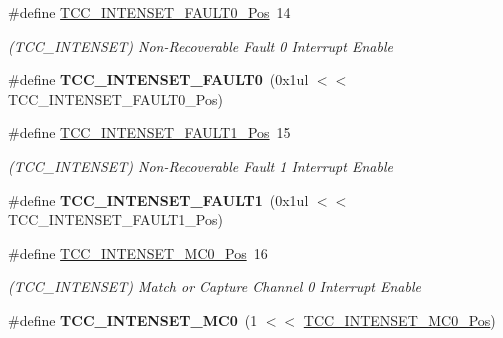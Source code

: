 \begin{DoxyCompactItemize}
\item 
\hypertarget{group___s_a_m_l21___t_c_c_gada8a7a66ce25dec67fad710168a4ca3c}{}\#define \hyperlink{group___s_a_m_l21___t_c_c_gada8a7a66ce25dec67fad710168a4ca3c}{T\+C\+C\+\_\+\+I\+N\+T\+E\+N\+S\+E\+T\+\_\+\+F\+A\+U\+L\+T0\+\_\+\+Pos}~14\label{group___s_a_m_l21___t_c_c_gada8a7a66ce25dec67fad710168a4ca3c}

\begin{DoxyCompactList}\small\item\em (T\+C\+C\+\_\+\+I\+N\+T\+E\+N\+S\+E\+T) Non-\/\+Recoverable Fault 0 Interrupt Enable \end{DoxyCompactList}\item 
\hypertarget{group___s_a_m_l21___t_c_c_ga0522b230885bf402ce1f88a5ba9d4943}{}\#define {\bfseries T\+C\+C\+\_\+\+I\+N\+T\+E\+N\+S\+E\+T\+\_\+\+F\+A\+U\+L\+T0}~(0x1ul $<$$<$ T\+C\+C\+\_\+\+I\+N\+T\+E\+N\+S\+E\+T\+\_\+\+F\+A\+U\+L\+T0\+\_\+\+Pos)\label{group___s_a_m_l21___t_c_c_ga0522b230885bf402ce1f88a5ba9d4943}

\item 
\hypertarget{group___s_a_m_l21___t_c_c_ga4c7d1301df480e2ec0f9bf7b544bec6b}{}\#define \hyperlink{group___s_a_m_l21___t_c_c_ga4c7d1301df480e2ec0f9bf7b544bec6b}{T\+C\+C\+\_\+\+I\+N\+T\+E\+N\+S\+E\+T\+\_\+\+F\+A\+U\+L\+T1\+\_\+\+Pos}~15\label{group___s_a_m_l21___t_c_c_ga4c7d1301df480e2ec0f9bf7b544bec6b}

\begin{DoxyCompactList}\small\item\em (T\+C\+C\+\_\+\+I\+N\+T\+E\+N\+S\+E\+T) Non-\/\+Recoverable Fault 1 Interrupt Enable \end{DoxyCompactList}\item 
\hypertarget{group___s_a_m_l21___t_c_c_gaa93d7b1bd671278aea65cb0de522ae17}{}\#define {\bfseries T\+C\+C\+\_\+\+I\+N\+T\+E\+N\+S\+E\+T\+\_\+\+F\+A\+U\+L\+T1}~(0x1ul $<$$<$ T\+C\+C\+\_\+\+I\+N\+T\+E\+N\+S\+E\+T\+\_\+\+F\+A\+U\+L\+T1\+\_\+\+Pos)\label{group___s_a_m_l21___t_c_c_gaa93d7b1bd671278aea65cb0de522ae17}

\item 
\hypertarget{group___s_a_m_l21___t_c_c_ga7cae7422f7f335c9f12ffd3d78a92341}{}\#define \hyperlink{group___s_a_m_l21___t_c_c_ga7cae7422f7f335c9f12ffd3d78a92341}{T\+C\+C\+\_\+\+I\+N\+T\+E\+N\+S\+E\+T\+\_\+\+M\+C0\+\_\+\+Pos}~16\label{group___s_a_m_l21___t_c_c_ga7cae7422f7f335c9f12ffd3d78a92341}

\begin{DoxyCompactList}\small\item\em (T\+C\+C\+\_\+\+I\+N\+T\+E\+N\+S\+E\+T) Match or Capture Channel 0 Interrupt Enable \end{DoxyCompactList}\item 
\hypertarget{group___s_a_m_l21___t_c_c_ga302fdd655164af17e9b60b31405291a7}{}\#define {\bfseries T\+C\+C\+\_\+\+I\+N\+T\+E\+N\+S\+E\+T\+\_\+\+M\+C0}~(1 $<$$<$ \hyperlink{group___s_a_m_l21___t_c_c_ga7cae7422f7f335c9f12ffd3d78a92341}{T\+C\+C\+\_\+\+I\+N\+T\+E\+N\+S\+E\+T\+\_\+\+M\+C0\+\_\+\+Pos})\label{group___s_a_m_l21___t_c_c_ga302fdd655164af17e9b60b31405291a7}


\end{DoxyCompactItemize}
